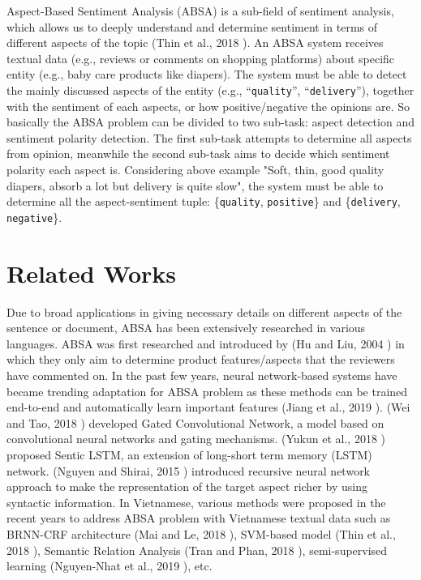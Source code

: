 Aspect-Based Sentiment Analysis (ABSA) is a sub-field of sentiment analysis, which allows us to deeply understand and determine sentiment in terms of different aspects of the topic (Thin et al., 2018 \cite{van2018transformation}). An ABSA system receives textual data (e.g., reviews or comments on shopping platforms) about specific entity (e.g., baby care products like diapers). The system must be able to detect the mainly discussed aspects of the entity (e.g., ``\texttt{quality}'', ``\texttt{delivery}''), together with the sentiment of each aspects, or how positive/negative the opinions are. So basically the ABSA problem can be divided to two sub-task: aspect detection and sentiment polarity detection. The first sub-task attempts to determine all aspects from opinion, meanwhile the second sub-task aims to decide which sentiment polarity each aspect is. Considering above example "Soft, thin, good quality diapers, absorb a lot but delivery is quite slow", the system must be able to determine all the aspect-sentiment tuple: \{\texttt{quality}, \texttt{positive}\} and \{\texttt{delivery}, \texttt{negative}\}.




\section{Related Works}
Due to broad applications in giving necessary details on different aspects of the sentence or document, ABSA has been extensively researched in various languages. ABSA was first researched and introduced by (Hu and Liu, 2004 \cite{hu2004mining}) in which they only aim to determine product features/aspects that the reviewers have commented on. In the past few years, neural network-based systems have became trending adaptation for ABSA problem as these methods can be trained end-to-end and automatically learn important features (Jiang et al., 2019 \cite{jiang2019challenge}). (Wei and Tao, 2018 \cite{xue2018aspect}) developed Gated Convolutional Network, a model based on convolutional neural networks and gating mechanisms. (Yukun et al., 2018 \cite{ma2018sentic}) proposed Sentic LSTM, an extension of long-short term memory (LSTM) network. (Nguyen and Shirai, 2015 \cite{nguyen2015phrasernn}) introduced recursive neural network approach to make the representation of the target aspect richer by using syntactic information.
In Vietnamese, various methods were proposed in the recent years to address ABSA problem with Vietnamese textual data such as BRNN-CRF architecture (Mai and Le, 2018 \cite{mai2018aspect}), SVM-based model (Thin et al., 2018 \cite{van2018transformation}), Semantic Relation Analysis (Tran and Phan, 2018 \cite{tran2018towards}), semi-supervised learning (Nguyen-Nhat et al., 2019 \cite{nguyen2019one}), etc. 



